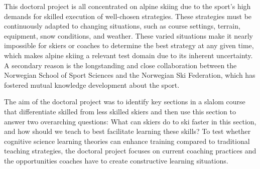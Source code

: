 
This doctoral project is all concentrated on alpine skiing due to the sport's high demands for skilled execution of well-chosen strategies. These strategies must be continuously adapted to changing situations, such as course settings, terrain, equipment, snow conditions, and weather. These varied situations make it nearly impossible for skiers or coaches to determine the best strategy at any given time, which makes alpine skiing a relevant test domain due to its inherent uncertainty. A secondary reason is the longstanding and close collaboration between the Norwegian School of Sport Sciences and the Norwegian Ski Federation, which has fostered mutual knowledge development about the sport.

The aim of the doctoral project was to identify key sections in a slalom course that differentiate skilled from less skilled skiers and then use this section to answer two overarching questions: What can skiers do to ski faster in this section, and how should we teach to best facilitate learning these skills? To test whether cognitive science learning theories can enhance training compared to traditional teaching strategies, the doctoral project focuses on current coaching practices and the opportunities coaches have to create constructive learning situations. 


